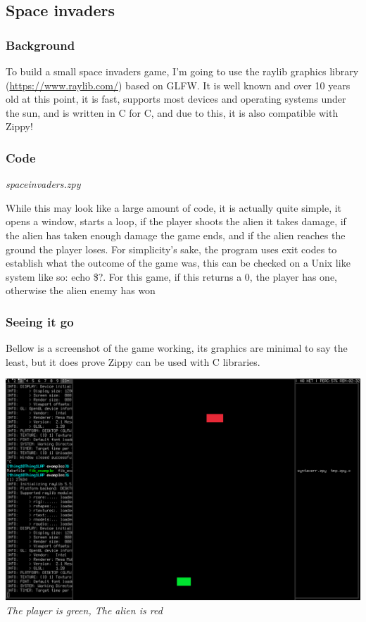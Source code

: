 \documentclass[a4paper,12pt]{article}
\begin{document}
{\subsection{Space invaders}
\subsubsection{Background}
To build a small space invaders game, I'm going to use the raylib graphics library 
(\url{https://www.raylib.com/})
based on GLFW. It is well known and over 10 years old at this point, it is fast, supports most devices and 
operating systems under the sun, and is written in C for C, and due to this, it is also compatible with Zippy!
\subsubsection{Code}

\textit{spaceinvaders.zpy}

While this may look like a large amount of code, it is actually quite simple, it opens a window, starts a loop, if
the player shoots the alien it takes damage, if the alien has taken enough damage the game ends, and if the alien 
reaches the ground the player loses. For simplicity's sake, the program uses exit codes to establish what the outcome
of the game was, this can be checked on a Unix like system like so: echo \$?. For this game, if this returns a 0, the
player has one, otherwise the alien enemy has won
\subsubsection{Seeing it go}
Bellow is a screenshot of the game working, its graphics are minimal to say the least, but it does prove Zippy can be 
used with C libraries.

\includegraphics[width=\textwidth, left]{./examples/spaceinvaders.png}
\textit{The player is green, The alien is red}

}
\end{document}
